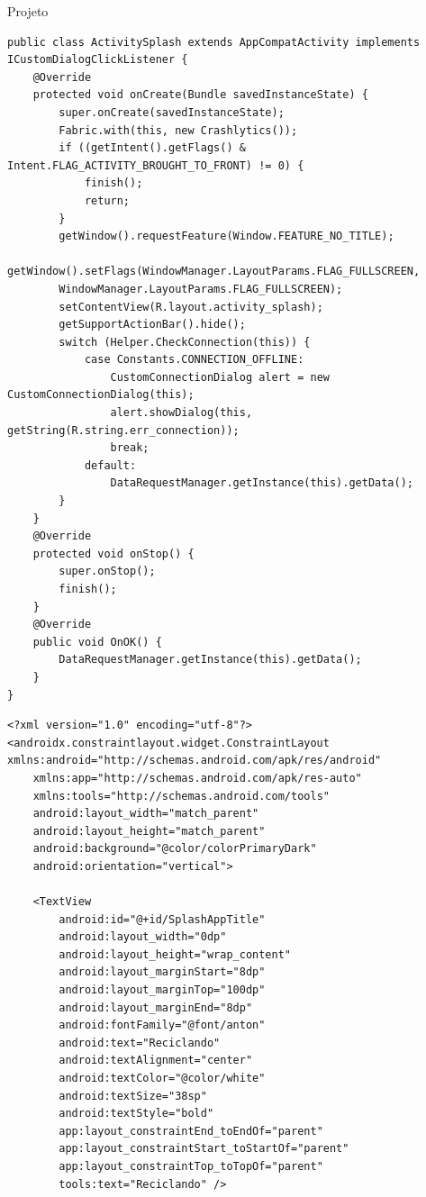 \documentclass[
	12pt,				%
	openright,			%
	twoside,			%
	a4paper,			%
	english,			%
	french,				%
	spanish,			%
	brazil				%
	]{abntex2}
\begin{document}
\begin{chapter}{Projeto}
\newpage
\begin{lstlisting}[numbers=none,
basicstyle=\small,
caption={ActivitySplash.java},
title={ActivitySplash.java},
label={ActivitySplash.java}]
public class ActivitySplash extends AppCompatActivity implements ICustomDialogClickListener {
    @Override
    protected void onCreate(Bundle savedInstanceState) {
        super.onCreate(savedInstanceState);
        Fabric.with(this, new Crashlytics());
        if ((getIntent().getFlags() & Intent.FLAG_ACTIVITY_BROUGHT_TO_FRONT) != 0) {
            finish();
            return;
        }
        getWindow().requestFeature(Window.FEATURE_NO_TITLE);
        getWindow().setFlags(WindowManager.LayoutParams.FLAG_FULLSCREEN,
        WindowManager.LayoutParams.FLAG_FULLSCREEN);
        setContentView(R.layout.activity_splash);
        getSupportActionBar().hide();
        switch (Helper.CheckConnection(this)) {
            case Constants.CONNECTION_OFFLINE:
                CustomConnectionDialog alert = new CustomConnectionDialog(this);
                alert.showDialog(this, getString(R.string.err_connection));
                break;
            default:
                DataRequestManager.getInstance(this).getData();
        }
    }
    @Override
    protected void onStop() {
        super.onStop();
        finish();
    }
    @Override
    public void OnOK() {
        DataRequestManager.getInstance(this).getData();
    }
}
\end{lstlisting}

\newpage
\begin{lstlisting}[numbers=none,basicstyle=\small,caption={ActivitySplash.xml}, title={ActivitySplash.xml}, label={activity_splash.xml}]
    <?xml version="1.0" encoding="utf-8"?>
<androidx.constraintlayout.widget.ConstraintLayout xmlns:android="http://schemas.android.com/apk/res/android"
    xmlns:app="http://schemas.android.com/apk/res-auto"
    xmlns:tools="http://schemas.android.com/tools"
    android:layout_width="match_parent"
    android:layout_height="match_parent"
    android:background="@color/colorPrimaryDark"
    android:orientation="vertical">

    <TextView
        android:id="@+id/SplashAppTitle"
        android:layout_width="0dp"
        android:layout_height="wrap_content"
        android:layout_marginStart="8dp"
        android:layout_marginTop="100dp"
        android:layout_marginEnd="8dp"
        android:fontFamily="@font/anton"
        android:text="Reciclando"
        android:textAlignment="center"
        android:textColor="@color/white"
        android:textSize="38sp"
        android:textStyle="bold"
        app:layout_constraintEnd_toEndOf="parent"
        app:layout_constraintStart_toStartOf="parent"
        app:layout_constraintTop_toTopOf="parent"
        tools:text="Reciclando" />


\end{lstlisting}
\end{chapter}
\end{document}
